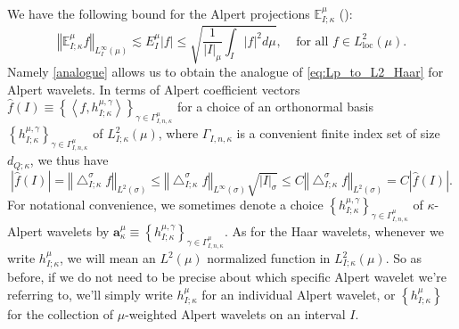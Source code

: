 \documentclass{amsart}%
\theoremstyle{plain}
\numberwithin{equation}{section}
\begin{document}
We have the following bound for the Alpert projections $\mathbb{E}_{I;\kappa
}^{\mu}$ (\cite[see (4.7) on page 14]{Saw6}):
\begin{equation}
\left\Vert \mathbb{E}_{I;\kappa}^{\mu}f\right\Vert _{L_{I}^{\infty}\left(
\mu\right)  }\lesssim E_{I}^{\mu}\left\vert f\right\vert \leq\sqrt{\frac
{1}{\left\vert I\right\vert _{\mu}}\int_{I}\left\vert f\right\vert ^{2}d\mu
},\ \ \ \ \ \text{for all }f\in L_{\operatorname*{loc}}^{2}\left(  \mu\right)
. \label{analogue}%
\end{equation}
Namely \eqref{analogue} allows us to obtain the analogue of \eqref{eq:Lp_to_L2_Haar} for Alpert wavelets.
In terms of Alpert coefficient vectors $\widehat{f}\left(  I\right)
\equiv\left\{  \left\langle f,h_{I;\kappa}^{\mu,\gamma}\right\rangle \right\}
_{\gamma\in\Gamma_{I,n,\kappa}^{\mu}}$ for a choice of an orthonormal basis
$\left\{  h_{I;\kappa}^{\mu,\gamma}\right\}  _{\gamma\in\Gamma_{I,n,\kappa
}^{\mu}}$ of $L_{I;\kappa}^{2}\left(  \mu\right)  $, where $\Gamma
_{I,n,\kappa}$ is a convenient finite index set of size $d_{Q;\kappa}$, we
thus have%
\begin{equation}
\left\vert \widehat{f}\left(  I\right)  \right\vert =\left\Vert \bigtriangleup
_{I;\kappa}^{\sigma}f\right\Vert _{L^{2}\left(  \sigma\right)  }\leq\left\Vert
\bigtriangleup_{I;\kappa}^{\sigma}f\right\Vert _{L^{\infty}\left(
\sigma\right)  }\sqrt{\left\vert I\right\vert _{\sigma}}\leq C\left\Vert
\bigtriangleup_{I;\kappa}^{\sigma}f\right\Vert _{L^{2}\left(  \sigma\right)
}=C\left\vert \widehat{f}\left(  I\right)  \right\vert . \label{analogue'}%
\end{equation}
For notational convenience, we sometimes denote a choice $\left\{
h_{I;\kappa}^{\mu,\gamma}\right\}  _{\gamma\in\Gamma_{I,n,\kappa}^{\mu}}$ of
$\kappa$-Alpert wavelets by $\mathbf{a}_{\kappa}^{\mu}\equiv\left\{
h_{I;\kappa}^{\mu,\gamma}\right\}  _{\gamma\in\Gamma_{I,n,\kappa}^{\mu}}$. As
for the Haar wavelets, whenever we write $h_{I; \kappa}^{\mu}$, we will mean
an $L^{2} \left( \mu\right) $ normalized function in $L^{2} _{I; \kappa}
\left(  \mu\right) $. So as before, if we do not need to be precise about
which specific Alpert wavelet we're referring to, we'll simply write $h_{I;
\kappa}^{\mu}$ for an individual Alpert wavelet, or $\left\{  h_{I; \kappa
}^{\mu} \right\} $ for the collection of $\mu$-weighted Alpert wavelets
on an interval $I$.
\end{document}
